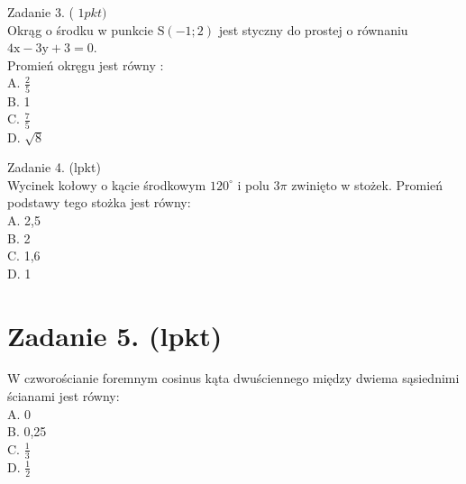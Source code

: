 \documentclass[10pt]{article}
\begin{document}
Zadanie 3. ( \(1 p k t)\)\\
Okrąg o środku w punkcie \(\mathrm{S}(-1 ; 2)\) jest styczny do prostej o równaniu \(4 \mathrm{x}-3 \mathrm{y}+3=0\).\\
Promień okręgu jest równy :\\
A. \(\frac{2}{5}\)\\
B. 1\\
C. \(\frac{7}{5}\)\\
D. \(\sqrt{8}\)

Zadanie 4. (lpkt)\\
Wycinek kołowy o kącie środkowym \(120^{\circ}\) i polu \(3 \pi\) zwinięto w stożek. Promień podstawy tego stożka jest równy:\\
A. 2,5\\
B. 2\\
C. 1,6\\
D. 1

\section*{Zadanie 5. (lpkt)}
W czworościanie foremnym cosinus kąta dwuściennego między dwiema sąsiednimi ścianami jest równy:\\
A. 0\\
B. 0,25\\
C. \(\frac{1}{3}\)\\
D. \(\frac{1}{2}\)
\end{document}
